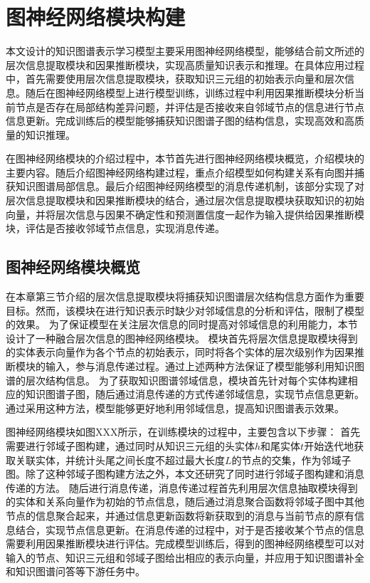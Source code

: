 \documentclass[algorithmlist, AutoFakeBold, AutoFakeSlant, figurelist, tablelist, nomlist, masters]{seuthesix}
\begin{document}
\section{图神经网络模块构建}
本文设计的知识图谱表示学习模型主要采用图神经网络模型，能够结合前文所述的层次信息提取模块和因果推断模块，实现高质量知识表示和推理。在具体应用过程中，首先需要使用层次信息提取模块，获取知识三元组的初始表示向量和层次信息。随后在图神经网络模型上进行模型训练，训练过程中利用因果推断模块分析当前节点是否存在局部结构差异问题，并评估是否接收来自邻域节点的信息进行节点信息更新。完成训练后的模型能够捕获知识图谱子图的结构信息，实现高效和高质量的知识推理。

在图神经网络模块的介绍过程中，本节首先进行图神经网络模块概览，介绍模块的主要内容。随后介绍图神经网络构建过程，重点介绍模型如何构建关系有向图并捕获知识图谱局部信息。最后介绍图神经网络模型的消息传递机制，该部分实现了对层次信息提取模块和因果推断模块的结合，通过层次信息提取模块获取知识的初始向量，并将层次信息与因果不确定性和预测置信度一起作为输入提供给因果推断模块，评估是否接收邻域节点信息，实现消息传递。

\subsection{图神经网络模块概览}
在本章第三节介绍的层次信息提取模块将捕获知识图谱层次结构信息方面作为重要目标。然而，该模块在进行知识表示时缺少对邻域信息的分析和评估，限制了模型的效果。
为了保证模型在关注层次信息的同时提高对邻域信息的利用能力，本节设计了一种融合层次信息的图神经网络模块。
模块首先将层次信息提取模块得到的实体表示向量作为各个节点的初始表示，同时将各个实体的层次级别作为因果推断模块的输入，参与消息传递过程。通过上述两种方法保证了模型能够利用知识图谱的层次结构信息。
为了获取知识图谱邻域信息，模块首先针对每个实体构建相应的知识图谱子图，随后通过消息传递的方式传递邻域信息，实现节点信息更新。通过采用这种方法，模型能够更好地利用邻域信息，提高知识图谱表示效果。

图神经网络模块如图XXX所示，在训练模块的过程中，主要包含以下步骤：
首先需要进行邻域子图构建，通过同时从知识三元组的头实体$h$和尾实体$t$开始迭代地获取关联实体，并统计头尾之间长度不超过最大长度$L$的节点的交集，作为邻域子图。除了这种邻域子图构建方法之外，本文还研究了同时进行邻域子图构建和消息传递的方法。 %
随后进行消息传递，消息传递过程首先利用层次信息抽取模块得到的实体和关系向量作为初始的节点信息，随后通过消息聚合函数将邻域子图中其他节点的信息聚合起来，并通过信息更新函数将新获取到的消息与当前节点的原有信息结合，实现节点信息更新。在消息传递的过程中，对于是否接收某个节点的信息需要利用因果推断模块进行评估。完成模型训练后，得到的图神经网络模型可以对输入的节点、知识三元组和邻域子图给出相应的表示向量，并应用于知识图谱补全和知识图谱问答等下游任务中。
\end{document}
